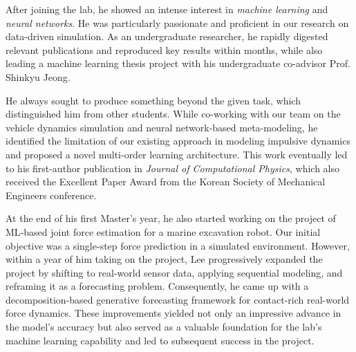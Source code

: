 After joining the lab, he showed an intense interest in \textit{machine learning} and \textit{neural networks}. He was particularly passionate and proficient in our research on data-driven simulation. As an undergraduate researcher, he rapidly digested relevant publications and reproduced key results within months, while also leading a machine learning thesis project with his undergraduate co-advisor Prof. Shinkyu Jeong.

He always sought to produce something beyond the given task, which distinguished him from other students. While co-working with our team on the vehicle dynamics simulation and neural network-based meta-modeling, 
he identified the limitation of our existing approach in modeling impulsive dynamics and proposed a novel multi-order learning architecture. This work eventually led to his first-author publication in \textit{Journal of Computational Physics}, which also received  the Excellent Paper Award from the Korean Society of Mechanical Engineers conference.

At the end of his first Master's year, he also started working on the project of ML-based joint force estimation for a marine excavation robot. 
Our initial objective was a single-step force prediction in a simulated environment. However, within a year of him taking on the project,
Lee progressively expanded the project by shifting to real-world sensor data, applying sequential modeling, and reframing it as a forecasting problem. Consequently, he came up with a decomposition-based generative forecasting framework for contact-rich real-world force dynamics. 
These improvements yielded not only an impressive advance in the model's accuracy but also served as a valuable foundation for the lab's machine learning capability and led to subsequent success in the project.

